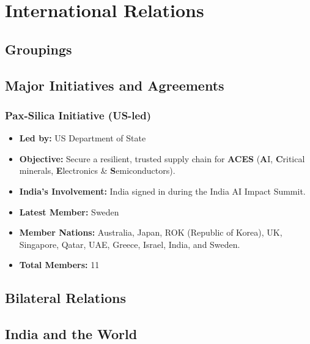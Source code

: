 \chapter{International Relations}
\section{Groupings}
\section{Major Initiatives and Agreements}
\subsection{Pax-Silica Initiative (US-led)}
\begin{itemize}
    \item \textbf{Led by:} US Department of State
    \item \textbf{Objective:} Secure a resilient, trusted supply chain for \textbf{ACES} (\textbf{A}I, \textbf{C}ritical minerals, \textbf{E}lectronics \& \textbf{S}emiconductors).
    \item \textbf{India's Involvement:} India signed in during the India AI Impact Summit.
    \item \textbf{Latest Member:} Sweden
    \item \textbf{Member Nations:} Australia, Japan, ROK (Republic of Korea), UK, Singapore, Qatar, UAE, Greece, Israel, India, and Sweden.
    \item \textbf{Total Members:} 11
\end{itemize}
\section{Bilateral Relations}
\section{India and the World}

